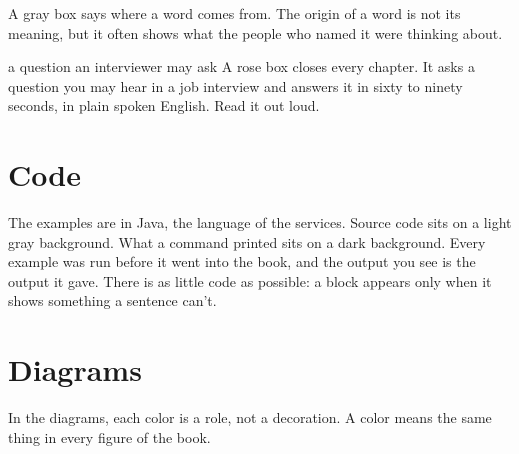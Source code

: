 \begin{etymology}
A gray box says where a word comes from. The origin of a word is not its
meaning, but it often shows what the people who named it were thinking about.
\end{etymology}

\begin{interview}{a question an interviewer may ask}
A rose box closes every chapter. It asks a question you may hear in a job
interview and answers it in sixty to ninety seconds, in plain spoken English.
Read it out loud.
\end{interview}

\section*{Code}

The examples are in Java, the language of the services. Source code sits on a
light gray background. What a command printed sits on a dark background.
Every example was run before it went into the book, and the output you see is
the output it gave. There is as little code as possible: a block appears only
when it shows something a sentence can't.

\section*{Diagrams}

In the diagrams, each color is a role, not a decoration. A color means the
same thing in every figure of the book.

